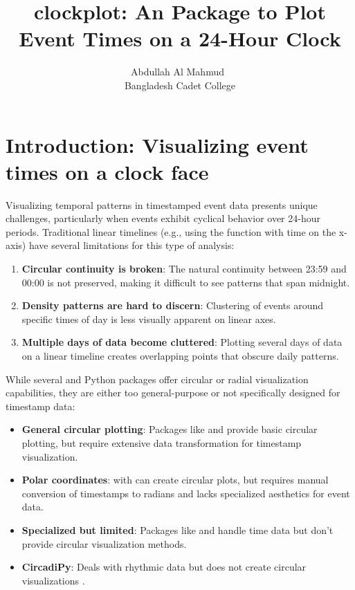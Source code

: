\documentclass[article]{jss}
\author{Abdullah Al Mahmud~\orcidlink{0000-0003-2814-8798}\\Bangladesh Cadet College}
\title{clockplot: An \proglang{R} Package to Plot Event Times on a 24-Hour Clock}
\newcommand{\fct}[1]{\code{#1()}}
\begin{document}




\section[Introduction: Visualizing event times on a clock face]{Introduction: Visualizing event times on a clock face} \label{sec:intro}

Visualizing temporal patterns in timestamped event data presents unique challenges, particularly when events exhibit cyclical behavior over 24-hour periods. Traditional linear timelines (e.g., using the  function \fct{geom\_point} with time on the x-axis) have several limitations for this type of analysis:

\begin{enumerate}
\item \textbf{Circular continuity is broken}: The natural continuity between 23:59 and 00:00 is not preserved, making it difficult to see patterns that span midnight.
\item \textbf{Density patterns are hard to discern}: Clustering of events around specific times of day is less visually apparent on linear axes.
\item \textbf{Multiple days of data become cluttered}: Plotting several days of data on a linear timeline creates overlapping points that obscure daily patterns.
\end{enumerate}

While several  and Python packages offer circular or radial visualization capabilities, they are either too general-purpose or not specifically designed for timestamp data:

\begin{itemize}
\item \textbf{General circular plotting}: Packages like  \citep{R-circular} and  \citep{R-plotrix} provide basic circular plotting, but require extensive data transformation for timestamp visualization.
\item \textbf{Polar coordinates}:  \citep{ggplot2} with \fct{coord\_polar()} can create circular plots, but requires manual conversion of timestamps to radians and lacks specialized aesthetics for event data.
\item \textbf{Specialized but limited}: Packages like  and  \citep{lubridate} handle time data but don't provide circular visualization methods.
\item \textbf{CircadiPy}: Deals with rhythmic data but does not create circular visualizations \citep{carvalho2024circadipy}.
\end{itemize}
\end{document}

